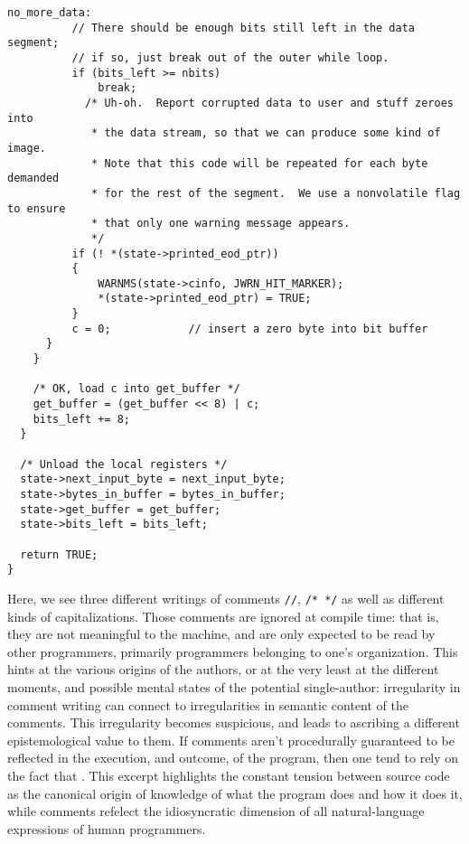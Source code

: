 \begin{lstlisting}[caption={buffer.c}, label={buffer.c}, float, floatplacement=H]
  no_more_data:
		  // There should be enough bits still left in the data segment; 
		  // if so, just break out of the outer while loop. 
		  if (bits_left >= nbits)
			  break;
			/* Uh-oh.  Report corrupted data to user and stuff zeroes into
			 * the data stream, so that we can produce some kind of image.
			 * Note that this code will be repeated for each byte demanded
			 * for the rest of the segment.  We use a nonvolatile flag to ensure
			 * that only one warning message appears.
			 */
		  if (! *(state->printed_eod_ptr)) 
		  {
			  WARNMS(state->cinfo, JWRN_HIT_MARKER);
			  *(state->printed_eod_ptr) = TRUE;
		  }
		  c = 0;			// insert a zero byte into bit buffer 
      }
    }

    /* OK, load c into get_buffer */
    get_buffer = (get_buffer << 8) | c;
    bits_left += 8;
  }

  /* Unload the local registers */
  state->next_input_byte = next_input_byte;
  state->bytes_in_buffer = bytes_in_buffer;
  state->get_buffer = get_buffer;
  state->bits_left = bits_left;

  return TRUE;
}
\end{lstlisting}

Here, we see three different writings of comments \lstinline{//}, \lstinline{/* */} as well as  different kinds of capitalizations. Those comments are ignored at compile time: that is, they are not meaningful to the machine, and are only expected to be read by other programmers, primarily programmers belonging to one's organization. This hints at the various origins of the authors, or at the very least at the different moments, and possible mental states of the potential single-author: irregularity in comment writing can connect to irregularities in semantic content of the comments. This irregularity becomes suspicious, and leads to ascribing a different epistemological value to them. If comments aren't procedurally guaranteed to be reflected in the execution, and outcome, of the program, then one tend to rely on the fact that . This excerpt highlights the constant tension between source code as the canonical origin of knowledge of what the program does and how it does it, while comments refelect the idiosyncratic dimension of all natural-language expressions of human programmers.

